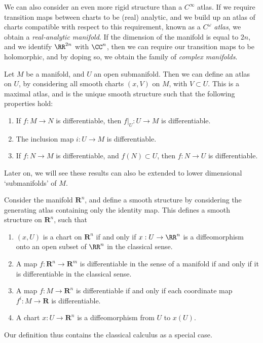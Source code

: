 We can also consider an even more rigid structure than a $C^\infty$ atlas. If we require transition maps between charts to be (real) analytic, and we build up an atlas of charts compatible with respect to this requirement, known as a \emph{$C^\omega$ atlas}, we obtain a \emph{real-analytic manifold}. If the dimension of the manifold is equal to $2n$, and we identify $\RR^{2n}$ with $\CC^n$, then we can require our transition maps to be holomorphic, and by doping so, we obtain the family of \emph{complex manifolds}.

\begin{example}
    Let $M$ be a manifold, and $U$ an open submanifold. Then we can define an atlas on $U$, by considering all smooth charts $(x,V)$ on $M$, with $V \subset U$. This is a maximal atlas, and is the unique smooth structure such that the following properties hold:
    \begin{enumerate}
        \item If $f: M \to N$ is differentiable, then $f|_U: U \to M$ is differentiable.
        \item The inclusion map $i:U \to M$ is differentiable.
        \item If $f: N \to M$ is differentiable, and $f(N) \subset U$, then $f: N \to U$ is differentiable.
    \end{enumerate}
    Later on, we will see these results can also be extended to lower dimensional `submanifolds' of $M$.
\end{example}

\begin{example}
    Consider the manifold $\mathbf{R}^n$, and define a smooth structure by considering the generating atlas containing only the identity map. This defines a smooth structure on $\mathbf{R}^n$, such that
    \begin{enumerate}
        \item $(x,U)$ is a chart on $\mathbf{R}^n$ if and only if $x: U \to \RR^n$ is a diffeomorphism onto an open subset of $\RR^n$ in the classical sense.
        \item A map $f:\mathbf{R}^n \to \mathbf{R}^m$ is differentiable in the sense of a manifold if and only if it is differentiable in the classical sense.
        \item A map $f:M \to \mathbf{R}^n$ is differentiable if and only if each coordinate map $f^i:M \to \mathbf{R}$ is differentiable.
        \item A chart $x:U \to \mathbf{R}^n$ is a diffeomorphism from $U$ to $x(U)$.
    \end{enumerate}
    Our definition thus contains the classical calculus as a special case.
\end{example}

